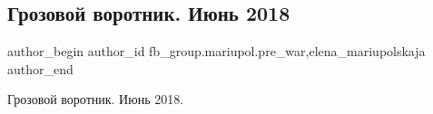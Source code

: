  
 
 
 
 

\subsection{Грозовой воротник. Июнь 2018}
\label{sec:17_02_2023.fb.fb_group.mariupol.pre_war.3.grozovoi_vorotnik__i}
 
\ifcmt
 author_begin
   author_id fb_group.mariupol.pre_war,elena_mariupolskaja
 author_end
\fi

Грозовой воротник. Июнь 2018.

